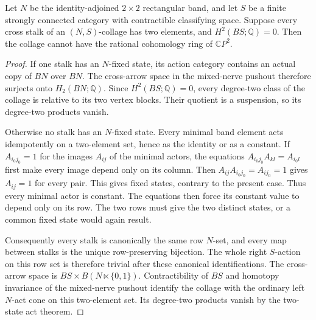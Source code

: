 \begin{lemma}
\label{C:sphere-band-two-state-strong-source}
Let $N$ be the identity-adjoined $2\times2$ rectangular band,
and let $S$ be a finite strongly connected category with
contractible classifying space. Suppose every cross stalk
of an $(N,S)$-collage has two elements, and $H^2(BS;\mathbb Q)=0$.
Then the collage cannot have the rational cohomology ring
of $\mathbb CP^2$.
\end{lemma}
\begin{proof}
If one stalk has an $N$-fixed state, its action category
contains an actual copy of $BN$ over $BN$. The cross-arrow
space in the mixed-nerve pushout therefore surjects onto
$H_2(BN;\mathbb Q)$. Since $H^2(BS;\mathbb Q)=0$, every
degree-two class of the collage is relative to its two
vertex blocks. Their quotient is a suspension, so its
degree-two products vanish.

Otherwise no stalk has an $N$-fixed state. Every minimal
band element acts idempotently on a two-element set, hence
as the identity or as a constant. If $A_{i_0j_0}=1$ for
the images $A_{ij}$ of the minimal actors, the equations
$A_{i_0j_0}A_{kl}=A_{i_0l}$ first make every image depend
only on its column. Then
$A_{ij}A_{i_0j_0}=A_{ij_0}=1$ gives $A_{ij}=1$ for
every pair. This gives fixed states, contrary to the
present case. Thus every minimal actor is constant.
The equations then force its constant value to depend
only on its row. The two rows must give the two distinct
states, or a common fixed state would again result.

Consequently every stalk is canonically the same row
$N$-set, and every map between stalks is the unique
row-preserving bijection. The whole right $S$-action on
this row set is therefore trivial after these canonical
identifications. The cross-arrow space is
$BS\times B(N\ltimes\{0,1\})$. Contractibility of $BS$
and homotopy invariance of the mixed-nerve pushout identify
the collage with the ordinary left $N$-act cone on this
two-element set. Its degree-two products vanish by the
two-state act theorem.
\end{proof}


